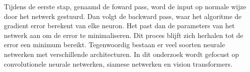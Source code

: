 Tijdens de eerste stap, genaamd de foward pass, word de input op normale wijze door het netwerk gestuurd. Dan volgt de backward pass, waar
het algoritme de gradient error berekent van elke neuron. Het past dan de parameters van het netwerk aan om de error te minimaliseren. 
Dit proces blijft zich herhalen tot de error een minimum bereikt.
\newline
\newline
Tegenwoordig bestaan er veel soorten neurale netwerken met verschillende architecturen. In dit onderzoek wordt gefocust op 
convolutionele neurale netwerken, siamese netwerken en vision transformers.
\newline
\newline

